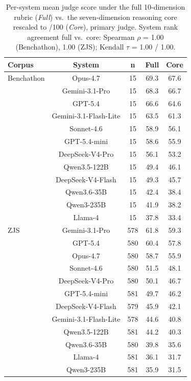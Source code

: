 \begin{table}[t]
\centering\footnotesize
\caption{Per-system mean judge score under the full 10-dimension rubric (\emph{Full}) vs.\ the seven-dimension reasoning core rescaled to /100 (\emph{Core}), primary judge. System rank agreement full vs.\ core: Spearman $\rho$ = 1.00 (Benchathon), 1.00 (ZJS); Kendall $\tau$ = 1.00 / 1.00.}
\label{tbl-reasoning-core}
\setlength{\tabcolsep}{3pt}
\begin{tabular*}{\columnwidth}{@{\extracolsep{\fill}}lcccc@{}}
\toprule
Corpus & System & n & Full & Core \\
\midrule
Benchathon & Opus-4.7 & 15 & 69.3 & 67.6 \\
 & Gemini-3.1-Pro & 15 & 68.3 & 66.7 \\
 & GPT-5.4 & 15 & 66.6 & 64.6 \\
 & Gemini-3.1-Flash-Lite & 15 & 63.5 & 61.3 \\
 & Sonnet-4.6 & 15 & 58.9 & 56.1 \\
 & GPT-5.4-mini & 15 & 58.6 & 55.9 \\
 & DeepSeek-V4-Pro & 15 & 56.1 & 53.2 \\
 & Qwen3.5-122B & 15 & 49.4 & 46.1 \\
 & DeepSeek-V4-Flash & 15 & 49.3 & 45.7 \\
 & Qwen3.6-35B & 15 & 42.4 & 38.4 \\
 & Qwen3-235B & 15 & 41.9 & 38.2 \\
 & Llama-4 & 15 & 37.8 & 33.4 \\
ZJS & Gemini-3.1-Pro & 578 & 61.8 & 59.3 \\
 & GPT-5.4 & 580 & 60.4 & 57.8 \\
 & Opus-4.7 & 580 & 58.7 & 55.9 \\
 & Sonnet-4.6 & 580 & 51.5 & 48.1 \\
 & DeepSeek-V4-Pro & 580 & 50.1 & 46.7 \\
 & GPT-5.4-mini & 581 & 49.7 & 46.2 \\
 & DeepSeek-V4-Flash & 579 & 45.9 & 42.1 \\
 & Gemini-3.1-Flash-Lite & 578 & 44.6 & 40.8 \\
 & Qwen3.5-122B & 581 & 44.2 & 40.3 \\
 & Qwen3.6-35B & 580 & 39.8 & 35.6 \\
 & Llama-4 & 581 & 36.1 & 31.7 \\
 & Qwen3-235B & 581 & 35.9 & 31.5 \\
\bottomrule
\end{tabular*}
\end{table}
